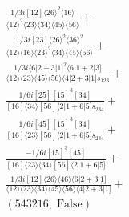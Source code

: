 \documentclass[varwidth, border=5pt]{standalone}
\begin{document}
\begin{my}
$\begin{gathered}
\scriptscriptstyle\frac{1/3i[12]⟨26⟩^2⟨16⟩}{⟨12⟩^2⟨23⟩⟨34⟩⟨45⟩⟨56⟩}+\\
\scriptscriptstyle\frac{1/3i[23]⟨26⟩^2⟨36⟩^2}{⟨12⟩⟨16⟩⟨23⟩^2⟨34⟩⟨45⟩⟨56⟩}+\\
\scriptscriptstyle\frac{1/3i⟨6|2+3|1]^2⟨6|1+2|3]}{⟨12⟩⟨23⟩⟨45⟩⟨56⟩⟨4|2+3|1]s_{123}}+\\
\scriptscriptstyle\frac{1/6i[25][15]^3[34]}{[16]⟨34⟩[56]⟨2|1+6|5]s_{234}}+\\
\scriptscriptstyle\frac{1/6i[45][15]^3[34]}{[16]⟨23⟩[56]⟨2|1+6|5]s_{234}}+\\
\scriptscriptstyle\frac{-1/6i[15]^3[45]}{[16]⟨23⟩⟨34⟩[56]⟨2|1+6|5]}+\\
\scriptscriptstyle\frac{1/3i[12]⟨26⟩⟨46⟩⟨6|2+3|1]}{⟨12⟩⟨23⟩⟨34⟩⟨45⟩⟨56⟩⟨4|2+3|1]}+\\
\scriptscriptstyle(543216,\;\text{False})\phantom{+}
\end{gathered}$
\end{my}
\end{document}
